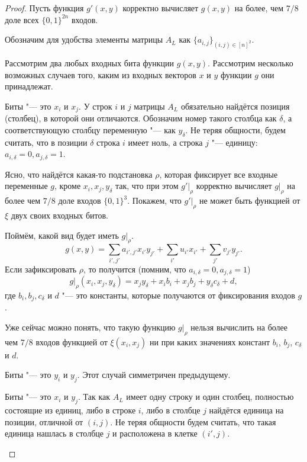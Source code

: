 \documentclass[oneside, a4paper]{article}
\theoremstyle{definition}
\theoremstyle{remark}
\begin{document}
\begin{proof}
Пусть функция $g'(x, y)$ корректно вычисляет $g(x, y)$ на более, чем $7/8$ доле
всех $\{0, 1\}^{2n}$ входов.

Обозначим для удобства элементы матрицы $A_L$ как $\{a_{i, j}\}_{(i, j) \in {[n]^2}}$.

Рассмотрим два любых входных бита функции $g(x, y)$. Рассмотрим несколько
возможных случаев того, каким из входных векторов $x$ и $y$ функции $g$ они
принадлежат.
\begin{description}
\item{Биты "--- это $x_i$ и $x_j$.} У строк $i$ и $j$ матрицы $A_L$ обязательно
найдётся позиция (столбец), в которой они отличаются. Обозначим номер такого
столбца как $\delta$, а соответствующую столбцу переменную "--- как $y_\delta$.
Не теряя общности, будем считать, что в позиции $\delta$ строка $i$ имеет ноль,
а строка $j$ "--- единицу: $a_{i, \delta} = 0, a_{j, \delta} = 1$.

Ясно, что найдётся какая-то подстановка $\rho$, которая фиксирует все входные
переменные $g$, кроме $x_i, x_j, y_\delta$ так, что при этом $g' \rvert _ \rho$
корректно вычисляет $g \rvert _ \rho$ на более чем $7/8$ доле входов $\{0,
1\}^3$. Покажем, что $g' \rvert _ \rho$ не может быть функцией от $\xi$ двух своих
входных битов.

Поймём, какой вид будет иметь $g \rvert _ \rho$. 
\[
g(x, y) = \sum_{i', j'} a_{i', j'} x_{i'} y_{j'} + \sum_{i'} u_{i'} x_{i'} + \sum_{j'} v_{j'} y_{j'}.
\]
Если зафиксировать $\rho$, то получится (помним, что $a_{i, \delta} = 0, a_{j, \delta} = 1$)
\[
g \rvert _ \rho (x_i, x_j, y_\delta) = x_j y_\delta + x_i b_i + x_j b_j + y_\delta c_\delta + d,
\]
где $b_i, b_j, c_\delta$ и $d$ "--- это константы, которые получаются от
фиксирования входов $g$.

Уже сейчас можно понять, что такую функцию $g \rvert _ \rho$ нельзя вычислить на
более чем $7/8$ входов функцией от $\xi(x_i, x_j)$ ни при каких значениях констант
$b_i$, $b_j$, $c_\delta$ и $d$.


\item{Биты "--- это $y_i$ и $y_j$.} Этот случай симметричен предыдущему.
\item{Биты "--- это $x_i$ и $y_j$.} Так как $A_L$ имеет одну строку и один
столбец, полностью состоящие из единиц, либо в строке $i$, либо в столбце $j$
найдётся единица на позиции, отличной от $(i, j)$. Не теряя общности будем
считать, что такая единица нашлась в столбце $j$ и расположена в клетке $(i',
j)$.


\end{description}
\end{proof}
\end{document}
